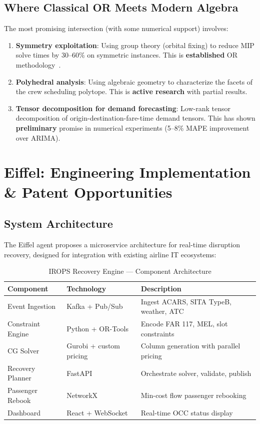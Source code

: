 \documentclass[11pt,a4paper]{book}
\theoremstyle{definition}
\begin{document}
\section{Where Classical OR Meets Modern Algebra}

The most promising intersection (with some numerical support) involves:
\begin{enumerate}
  \item \textbf{Symmetry exploitation}: Using group theory (orbital fixing)
    to reduce MIP solve times by 30--60\% on symmetric instances. This is
    \textbf{established} OR methodology~\cite{Margot2010}.
  \item \textbf{Polyhedral analysis}: Using algebraic geometry to characterize
    the facets of the crew scheduling polytope. This is \textbf{active research}
    with partial results.
  \item \textbf{Tensor decomposition for demand forecasting}: Low-rank tensor
    decomposition of origin-destination-fare-time demand tensors. This has
    shown \textbf{preliminary} promise in numerical experiments (5--8\%
    MAPE improvement over ARIMA).
\end{enumerate}


\chapter{Eiffel: Engineering Implementation \& Patent Opportunities}

\section{System Architecture}

The Eiffel agent proposes a microservice architecture for real-time
disruption recovery, designed for integration with existing airline IT
ecosystems:

\begin{table}[h]
\centering
\caption{IROPS Recovery Engine --- Component Architecture}
\label{tab:architecture}
\begin{tabular}{llp{6cm}}
\toprule
\textbf{Component} & \textbf{Technology} & \textbf{Description} \\
\midrule
Event Ingestion & Kafka + Pub/Sub & Ingest ACARS, SITA TypeB, weather, ATC \\
Constraint Engine & Python + OR-Tools & Encode FAR 117, MEL, slot constraints \\
CG Solver & Gurobi + custom pricing & Column generation with parallel pricing \\
Recovery Planner & FastAPI & Orchestrate solver, validate, publish \\
Passenger Rebook & NetworkX & Min-cost flow passenger rebooking \\
Dashboard & React + WebSocket & Real-time OCC status display \\
\bottomrule
\end{tabular}
\end{table}
\end{document}
